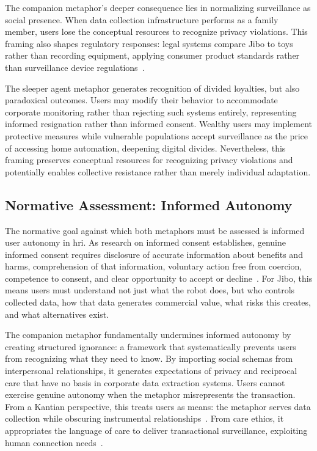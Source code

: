 \documentclass{ieee-portfolio}
\begin{document}
The companion metaphor's deeper consequence lies in normalizing surveillance as social presence. When data collection infrastructure performs as a family member, users lose the conceptual resources to recognize privacy violations. This framing also shapes regulatory responses: legal systems compare Jibo to toys rather than recording equipment, applying consumer product standards rather than surveillance device regulations~\cite{jones_hacking_2017}.

The sleeper agent metaphor generates recognition of divided loyalties, but also paradoxical outcomes. Users may modify their behavior to accommodate corporate monitoring rather than rejecting such systems entirely, representing informed resignation rather than informed consent. Wealthy users may implement protective measures while vulnerable populations accept surveillance as the price of accessing home automation, deepening digital divides. Nevertheless, this framing preserves conceptual resources for recognizing privacy violations and potentially enables collective resistance rather than merely individual adaptation.

\subsection{Normative Assessment: Informed Autonomy}

The normative goal against which both metaphors must be assessed is informed user autonomy in \gls{hri}. As research on informed consent establishes, genuine informed consent requires disclosure of accurate information about benefits and harms, comprehension of that information, voluntary action free from coercion, competence to consent, and clear opportunity to accept or decline~\cite{millett_cookies_2001}. For Jibo, this means users must understand not just what the robot does, but who controls collected data, how that data generates commercial value, what risks this creates, and what alternatives exist.

The companion metaphor fundamentally undermines informed autonomy by creating structured ignorance: a framework that systematically prevents users from recognizing what they need to know. By importing social schemas from interpersonal relationships, it generates expectations of privacy and reciprocal care that have no basis in corporate data extraction systems. Users cannot exercise genuine autonomy when the metaphor misrepresents the transaction. From a Kantian perspective, this treats users as means: the metaphor serves data collection while obscuring instrumental relationships~\cite{fjeld_principled_2020}. From care ethics, it appropriates the language of care to deliver transactional surveillance, exploiting human connection needs~\cite{noddings_caring_1986}.
\end{document}
